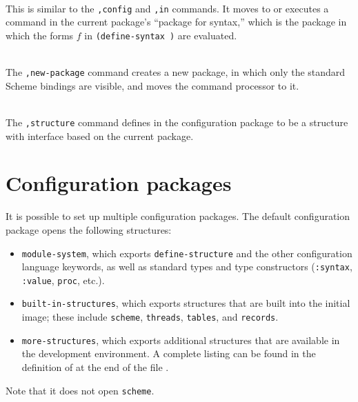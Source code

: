 \begin{description}
\item {} \\
    This is similar to the {\tt ,config} and {\tt ,in} commands.  It
    moves to or executes a command in the current package's ``package
    for syntax,'' which is the package in which the forms $f$ in
    {\tt (define-syntax  )} are evaluated.

\item {} \\
    The {\tt,new-package} command creates a new package, in which only
    the standard Scheme bindings are visible, and moves the command
    processor to it.

\item {} \\
    The {\tt ,structure} command defines  in the
    configuration package to be a structure with interface
     based on the current package.

\end{description}



\section{Configuration packages}
\label{config-packages}

It is possible to set up multiple configuration packages.  The default
configuration package opens the following structures:
\begin{itemize}
\item {\tt module-system}, which exports {\tt define-structure} and the
      other configuration language keywords, as well as standard types
      and type constructors ({\tt :syntax}, {\tt :value}, {\tt proc}, etc.).
\item {\tt built-in-structures}, which exports structures that are
      built into the initial \hack{} image; these include
      {\tt scheme}, {\tt threads}, {\tt tables}, and {\tt records}.
\item {\tt more-structures}, which exports additional structures that
      are available in the development environment. 
      A complete listing
      can be found in the definition of 
      at the end of the file .
\end{itemize}
Note that it does not open {\tt scheme}.

